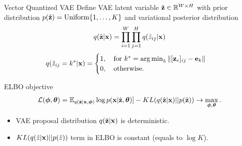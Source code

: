 \begin{frame}{Vector Quantized VAE}
	Define VAE latent variable $\hat{\mathbf{z}} \in \mathbb{R}^{W \times H}$ with prior distribution $p(\hat{\mathbf{z}}) = \text{Uniform}\{1, \dots, K\}$ and variational posterior distribution 
	\vspace{-0.3cm}
	\[
		q(\hat{\mathbf{z}} | \mathbf{x}) = \prod_{i=1}^W \prod_{j=1}^H q(\hat{z}_{ij} | \mathbf{x})
	\]
	\vspace{-0.3cm}
	\[
		q(\hat{z}_{ij} = k^* | \mathbf{x}) = \begin{cases}
			1 , \quad \text{for } k^* = \operatorname*{arg\,min}_k \| [\mathbf{z}_e]_{ij} - \mathbf{e}_k \| \\
			0, \quad \text{otherwise}.
		\end{cases}
	\]
	\vspace{-0.5cm}
	\begin{block}{ELBO objective}
		\vspace{-0.5cm}
		\[
		 \mathcal{L} (\boldsymbol{\phi}, \boldsymbol{\theta})  = \mathbb{E}_{q(\hat{\mathbf{z}} | \mathbf{x}, \boldsymbol{\phi})} \log p(\mathbf{x} | \hat{\mathbf{z}}, \boldsymbol{\theta})] - KL(q(\hat{\mathbf{z}}| \mathbf{x}) || p(\hat{\mathbf{z}})) \rightarrow \max_{\boldsymbol{\phi}, \boldsymbol{\theta}}.
		\]	
		\vspace{-0.5cm}
	\end{block}
	\begin{itemize}
		\item VAE proposal distribution $q(\hat{\mathbf{z}} | \mathbf{x})$ is deterministic. 
		\item $KL(q(\hat{z}| \mathbf{x}) || p(\hat{z}))$ term in ELBO is constant (equals to $\log K$).
	\end{itemize}
	
\end{frame}
